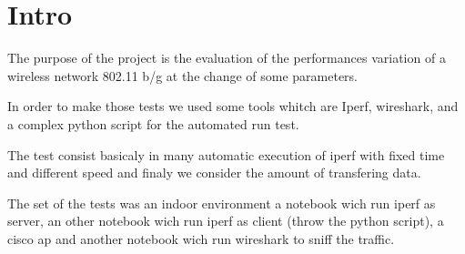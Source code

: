 \documentclass[11pt]{amsart}
\begin{document}
\section{Intro}

The purpose of the project is the evaluation of the performances variation of a wireless network 802.11 b/g at the change of some parameters.
 
In order to make those tests we used some tools whitch are Iperf, wireshark, and a complex python script for the automated run test.

The test consist basicaly in many automatic execution of iperf with fixed time and different speed and finaly we consider the amount of transfering data.

The set of the tests was an indoor environment a notebook wich run iperf as server, an other notebook wich run iperf as client (throw the python script), a cisco ap and another notebook wich run wireshark to sniff the traffic.
\end{document}
